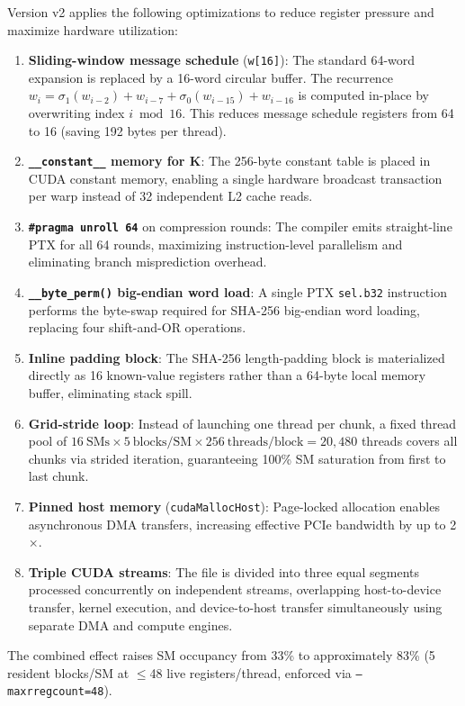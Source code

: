 Version v2 applies the following optimizations to reduce register pressure and maximize hardware utilization:
\begin{enumerate}
    \item \textbf{Sliding-window message schedule} (\texttt{w[16]}): The standard 64-word expansion is replaced by a 16-word circular buffer. The recurrence $w_i = \sigma_1(w_{i-2}) + w_{i-7} + \sigma_0(w_{i-15}) + w_{i-16}$ is computed in-place by overwriting index $i \bmod 16$. This reduces message schedule registers from 64 to 16 (saving 192 bytes per thread).
    \item \textbf{\texttt{\_\_constant\_\_} memory for K}: The 256-byte constant table is placed in CUDA constant memory, enabling a single hardware broadcast transaction per warp instead of 32 independent L2 cache reads.
    \item \textbf{\texttt{\#pragma unroll 64}} on compression rounds: The compiler emits straight-line PTX for all 64 rounds, maximizing instruction-level parallelism and eliminating branch misprediction overhead.
    \item \textbf{\texttt{\_\_byte\_perm()} big-endian word load}: A single PTX \texttt{sel.b32} instruction performs the byte-swap required for SHA-256 big-endian word loading, replacing four shift-and-OR operations.
    \item \textbf{Inline padding block}: The SHA-256 length-padding block is materialized directly as 16 known-value registers rather than a 64-byte local memory buffer, eliminating stack spill.
    \item \textbf{Grid-stride loop}: Instead of launching one thread per chunk, a fixed thread pool of $16~\text{SMs} \times 5~\text{blocks/SM} \times 256~\text{threads/block} = 20{,}480$ threads covers all chunks via strided iteration, guaranteeing 100\% SM saturation from first to last chunk.
    \item \textbf{Pinned host memory} (\texttt{cudaMallocHost}): Page-locked allocation enables asynchronous DMA transfers, increasing effective PCIe bandwidth by up to 2$\times$.
    \item \textbf{Triple CUDA streams}: The file is divided into three equal segments processed concurrently on independent streams, overlapping host-to-device transfer, kernel execution, and device-to-host transfer simultaneously using separate DMA and compute engines.
\end{enumerate}

The combined effect raises SM occupancy from 33\% to approximately 83\% (5 resident blocks/SM at $\leq$48 live registers/thread, enforced via \texttt{--maxrregcount=48}).

